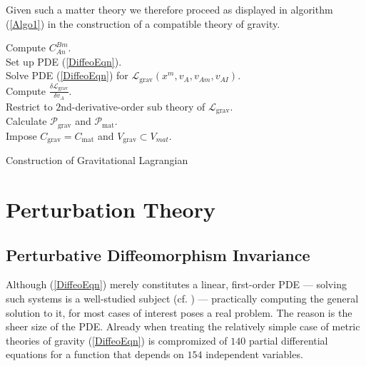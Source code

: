 \documentclass[%
 reprint,
nofootinbib,
 amsmath,amssymb,
 aps,
 prd,
floatfix,
]{revtex4-2}
\begin{document}
Given such a matter theory we therefore proceed as displayed in algorithm (\ref{Algo1}) in the construction of a compatible theory of gravity.
\begin{algorithm}[hbt!]
\SetAlgoLined
{}
Compute $C^{Bm}_{An}$. \\
Set up PDE (\ref{DiffeoEqn}). \\
Solve PDE (\ref{DiffeoEqn}) for $\mathcal{L}_{\text{grav}}(x^m,v_A,v_{Am},v_{AI})$.\\
Compute $\frac{\delta \mathcal{L}_{\text{grav}}}{\delta v_A}$.\\
Restrict to $2$nd-derivative-order sub theory of $\mathcal{L}_{\text{grav}}$.\\
Calculate $\mathcal{P}_{\text{grav}}$ and $\mathcal{P}_{\text{mat}}$.\\
Impose $C_{\text{grav}} = C_{\text{mat}}$ and $V_{\text{grav}} \subset V_{mat}.$
 \caption{Construction of Gravitational Lagrangian}\label{Algo1}
\end{algorithm}
\section{Perturbation Theory}\label{chapter2}
\subsection{Perturbative Diffeomorphism Invariance}
Although (\ref{DiffeoEqn}) merely constitutes a linear, first-order PDE --- solving such systems is a well-studied subject (cf. \cite{Hilbert}) --- practically computing the general solution to it, for most cases of interest poses a real problem. The reason is the sheer size of the PDE. Already when treating the relatively simple case of metric theories of gravity (\ref{DiffeoEqn}) is compromized of $140$ partial differential equations for a function that depends on $154$ independent variables.
\end{document}
